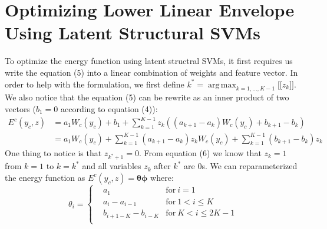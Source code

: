 \documentclass{article}
\DeclareMathOperator*{\argmax}{arg\,max}
\begin{document}
		\section{Optimizing Lower Linear Envelope Using Latent Structural SVMs}
		To optimize the energy function using latent structral SVMs, it first requires us write the equation (5) into a linear combination of weights and feature vector. In order to help with the formulation, we first define $k^* = \argmax_{k=1,\dots,K-1} \big[\big[z_{k}\big]\big]$. We also notice that the equation (5) can be rewrite as an inner product of two vectors ($b_1=0$ according to equation  (4)):
		\begin{align}
		\label{eq:originalenergy}
		E^c(y_c,z)&=a_1W_c(y_c)+b_1+\sum_{k=1}^{K-1}z_k((a_{k+1}-a_k)W_c(y_c)+b_{k+1}-b_k)\\
		&=a_1W_c(y_c)+\sum_{k=1}^{K-1}(a_{k+1}-a_k)z_kW_c(y_c)+\sum_{k=1}^{K-1}(b_{k+1}-b_k)z_k
		\end{align}
		One thing to notice is that $z_{k^*+1}=0$. From equation (6) we know that $z_k = 1$ from $k=1$ to $k=k^*$ and all variables $z_k$ after $k^*$ are $0$s. We can reparameterized the energy function as $E^c(y_c,z)=\mathbf{\theta}\mathbf{\phi}$ where:
		\begin{equation}
			\theta_i = \left\{
			\begin{aligned}
				& a_1	& \text{for} \ i=1\\
				& a_i-a_{i-1} & \text{for}\ 1< i \leq K\\
				& b_{i+1-K}-b_{i-K} & \text{for} \ K<i\le2K-1\\
			\end{aligned}
			\right.
		\end{equation}
		
\end{document}
